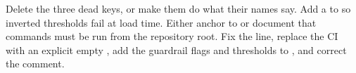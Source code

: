 \begin{recommended}
Delete the three dead keys, or make them do what their names say. Add a  to  so inverted thresholds fail at load time. Either anchor  to  or document that commands must be run from the repository root. Fix the  line, replace the CI  with an explicit empty , add the guardrail flags and thresholds to , and correct the  comment.
\end{recommended}
